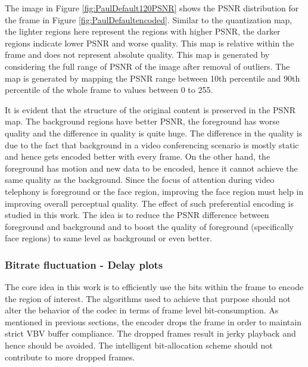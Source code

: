 \documentclass[11pt]{article} %
\begin{document}
The image in Figure \ref{fig:PaulDefault120PSNR} shows the PSNR distribution for the frame in Figure \ref{fig:PaulDefaultencoded}. Similar to the quantization map, the lighter regions here represent the regions with higher PSNR, the darker regions indicate lower PSNR and worse quality. This map is relative within the frame and does not represent  absolute quality. This map is generated by considering the full range of PSNR of the image after removal of outliers. The map is generated by mapping the PSNR range between 10th percentile and 90th percentile of the whole frame to values between 0 to 255.

It is evident that the structure of the original content is preserved in the PSNR map. The background regions have better PSNR, the foreground has worse quality and the difference in quality is quite huge. The difference in the quality is due to the fact that background in a video conferencing scenario is mostly static and hence gets encoded better with every frame. On the other hand, the foreground has motion and new data to be encoded, hence it cannot achieve the same quality as the background. Since the focus of attention during video telephony is foreground or the face region, improving the face region must help in improving overall perceptual quality. The effect of such preferential encoding is studied in this work. The idea is to reduce the PSNR difference between foreground and background and to boost the quality of foreground (specifically face regions) to same level as background or even better.
\subsubsection{Bitrate fluctuation - Delay plots} \label{sec: setup delay plots}
The core idea in this work is to efficiently use the bits within the frame to encode the region of interest. The algorithms used to achieve that purpose should not alter the behavior of the codec in terms of frame level bit-consumption. As mentioned in previous sections, the encoder drops the frame in order to maintain strict VBV buffer compliance. The dropped frames result in jerky playback and hence should be avoided. The intelligent bit-allocation scheme should not contribute to more dropped frames.
\end{document}
